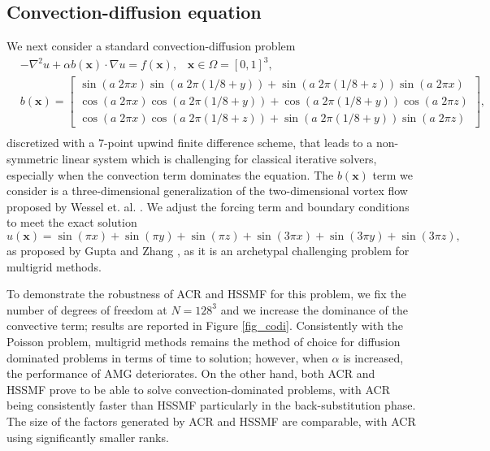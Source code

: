 \documentclass[]{elsarticle}
\begin{document}
\subsection{Convection-diffusion equation}

We next consider a standard convection-diffusion problem
\begin{equation}
	\begin{aligned}
		&-\nabla^{2} u  + \alpha b(\mathbf{x}) \cdot \nabla u = f(\mathbf{x}), \;\;\; \mathbf{x} \in \Omega = [0,1]^3, \\
		&b(\mathbf{x}) = \begin{bmatrix}
			\sin(a\;2\pi x) \sin(a\;2\pi (1/8 + y)) +  \sin(a\;2\pi (1/8 + z)) \sin(a\;2\pi x) \\
			\cos(a\;2\pi x) \cos(a\;2\pi (1/8 + y)) +  \cos(a\;2\pi (1/8 + y)) \cos(a\;2\pi z) \\
			\cos(a\;2\pi x) \cos(a\;2\pi (1/8 + z)) +  \sin(a\;2\pi (1/8 + y)) \sin(a\;2\pi z)
		\end{bmatrix},\\
	\end{aligned}
\label{eq:codi}
\end{equation}
discretized with a 7-point upwind finite difference scheme, that leads to a non-symmetric linear system which is challenging for classical iterative solvers, especially when the convection term dominates the equation. The $b(\mathbf{x})$ term we consider is a three-dimensional generalization of the two-dimensional vortex flow proposed by Wessel et. al. \cite{ames2014numerical}. We adjust the forcing term and boundary conditions to meet the exact solution
$$u(\mathbf{x}) = \sin(\pi x)+\sin(\pi y)+\sin(\pi z)+\sin(3\pi x)+\sin(3\pi y)+\sin(3\pi z),$$
as proposed by Gupta and Zhang \cite{gupta2000high}, as it is an archetypal challenging problem for multigrid methods.

To demonstrate the robustness of ACR and HSSMF for this problem, we fix the number of degrees of freedom at $N=128^3$ and we increase the dominance of the convective term; results are reported in Figure \ref{fig_codi}. Consistently with the Poisson problem, multigrid methods remains the method of choice for diffusion dominated problems in terms of time to solution; however, when $\alpha$ is increased, the performance of AMG deteriorates. On the other hand, both ACR and HSSMF prove to be able to solve convection-dominated problems, with ACR being consistently faster than HSSMF particularly in the back-substitution phase. The size of the factors generated by ACR and HSSMF are comparable, with ACR using significantly smaller ranks.
\end{document}
